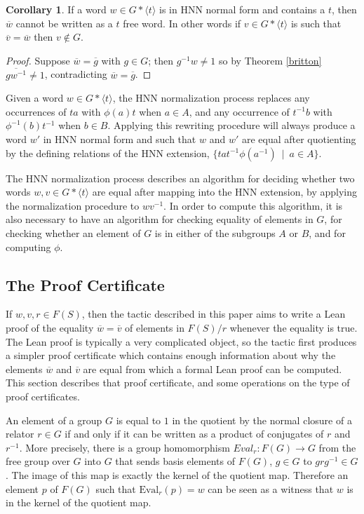 \documentclass[12pt]{article} %
\theoremstyle{definition}
\theoremstyle{definition}
\newtheorem{corol}[thm]{Corollary}
\theoremstyle{definition}
\theoremstyle{definition}
\begin{document}
\begin{corol}\label{genbritton}
  If a word $w \in G \ast \langle t \rangle$ is in HNN normal form and
  contains a $t$, then $\overline{w}$ cannot be written as a $t$ free word.
  In other words if $v \in G \ast \langle t \rangle$ is such that
  $\overline{v} = \overline{w}$ then $v \notin G$.
\end{corol}
\begin{proof}
Suppose $\overline{w} = \overline{g}$ with $g \in G$;
then $g^{-1}w \ne 1$ so by Theorem \ref{britton}
$\overline{gw^{-1}} \ne 1$, contradicting $\overline{w} = \overline{g}$.
\end{proof}
Given a word $w \in G \ast \langle t \rangle$, the HNN normalization process
replaces any occurrences of $ta$ with $\phi(a)t$ when $a \in A$, and
any occurrence of $t^{-1}b$ with $\phi^{-1}(b)t^{-1}$ when $b \in B$.
Applying this rewriting procedure will always produce a word $w'$ in HNN normal form and
such that $w$ and $w'$ are equal after quotienting by the defining relations
of the HNN extension, $\{ta t^{-1} \phi(a^{-1}) \ \mid \  a \in A\}$.

The HNN normalization process describes an algorithm for deciding
whether two words $w, v \in G \ast \langle t \rangle$ are equal
after mapping into the HNN extension, by applying the normalization procedure to
 $wv^{-1}$.
In order to compute this algorithm, it is also necessary to have an algorithm for checking equality
of elements in $G$,
for checking whether an element of $G$ is in either of the subgroups $A$ or $B$, and for computing $\phi$.

\subsection{The Proof Certificate}\label{proofcert}

If $w, v, r \in F(S)$, then the tactic described in this paper aims to write a
Lean proof of the equality
$\overline{w} = \overline{v}$ of elements in $F(S) / r$ whenever the equality is true.
The Lean proof is typically
a very complicated object, so the tactic first produces a simpler proof certificate which
contains enough information about why the elements $\overline{w}$ and $\overline{v}$ are equal
from which a formal Lean proof can be computed. This section describes that proof certificate,
and some operations on the type of proof certificates.

An element of a group $G$ is equal to $1$ in the quotient by the normal closure
of a relator $r \in G$ if and only if it can be written as a product of conjugates of
$r$ and $r^{-1}$.
More precisely, there is a group homomorphism $\textit{Eval}_r : F(G) \to G$ from the free group
over $G$ into $G$ that sends basis elements of $F(G)$,
$g \in G$ to $grg^{-1} \in G$. The image of this map is exactly the kernel of the quotient map.
Therefore an element $p$ of $F(G)$ such that $\text{Eval}_r(p) = w$
can be seen as a witness that $w$ is in the kernel of the quotient map.
\end{document}
